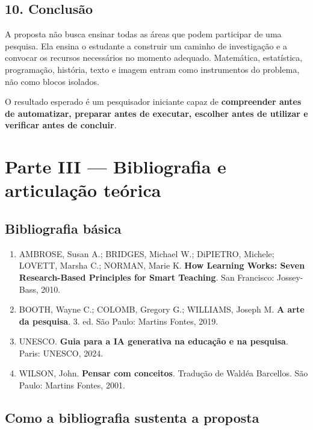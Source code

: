 \documentclass[11pt,a4paper]{article}
\begin{document}
\subsection*{10. Conclusão}

A proposta não busca ensinar todas as áreas que podem participar de uma pesquisa. Ela
ensina o estudante a construir um caminho de investigação e a convocar os recursos
necessários no momento adequado. Matemática, estatística, programação, história, texto e
imagem entram como instrumentos do problema, não como blocos isolados.

O resultado esperado é um pesquisador iniciante capaz de \textbf{compreender antes de
automatizar, preparar antes de executar, escolher antes de utilizar e verificar antes de
concluir}.

\newpage

\section*{Parte III --- Bibliografia e articulação teórica}

\subsection*{Bibliografia básica}

\begin{enumerate}
\item AMBROSE, Susan A.; BRIDGES, Michael W.; DiPIETRO, Michele; LOVETT, Marsha C.; NORMAN,
Marie K. \textbf{How Learning Works: Seven Research-Based Principles for Smart Teaching}.
San Francisco: Jossey-Bass, 2010.

\item BOOTH, Wayne C.; COLOMB, Gregory G.; WILLIAMS, Joseph M. \textbf{A arte da pesquisa}.
3. ed. São Paulo: Martins Fontes, 2019.

\item UNESCO. \textbf{Guia para a IA generativa na educação e na pesquisa}. Paris: UNESCO, 2024.

\item WILSON, John. \textbf{Pensar com conceitos}. Tradução de Waldéa Barcellos. São Paulo:
Martins Fontes, 2001.
\end{enumerate}

\subsection*{Como a bibliografia sustenta a proposta}
\end{document}
